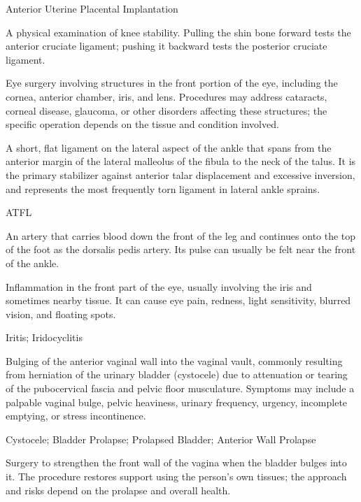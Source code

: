 \synonyms
Anterior Uterine Placental Implantation

 A physical examination of knee stability. Pulling the shin bone forward tests the anterior cruciate ligament; pushing it backward tests the posterior cruciate ligament.

 Eye surgery involving structures in the front portion of the eye, including
the cornea, anterior chamber, iris, and lens. Procedures may address cataracts, corneal
disease, glaucoma, or other disorders affecting these structures; the specific operation
depends on the tissue and condition involved.

 A short, flat ligament on the lateral aspect of the ankle that spans from the anterior margin of the lateral malleolus of the fibula to the neck of the talus. It is the primary stabilizer against anterior talar displacement and excessive inversion, and represents the most frequently torn ligament in lateral ankle sprains.

\synonyms
ATFL

 An artery that carries blood down the front of the leg and continues onto the top of the foot as the dorsalis pedis artery. Its pulse can usually be felt near the front of the ankle.

 Inflammation in the front part of the eye, usually involving the iris and sometimes nearby tissue. It can cause eye pain, redness, light sensitivity, blurred vision, and floating spots.

\synonyms
Iritis; Iridocyclitis

 Bulging of the anterior vaginal wall into the vaginal vault, commonly resulting from herniation of the urinary bladder (cystocele) due to attenuation or tearing of the pubocervical fascia and pelvic floor musculature. Symptoms may include a palpable vaginal bulge, pelvic heaviness, urinary frequency, urgency, incomplete emptying, or stress incontinence.

\synonyms
Cystocele; Bladder Prolapse; Prolapsed Bladder; Anterior Wall Prolapse

 Surgery to strengthen the front wall of the vagina when the bladder bulges into it. The procedure restores support using the person’s own tissues; the approach and risks depend on the prolapse and overall health.

